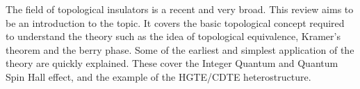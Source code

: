 The field of topological insulators is a recent and very broad. This review aims to be an introduction to the topic. It covers the basic topological concept required to understand the theory such as the idea of topological equivalence, Kramer's theorem and the berry phase. Some of the earliest and simplest application of the theory  are quickly explained. These cover the Integer Quantum and Quantum Spin Hall effect, and the example of the HGTE/CDTE heterostructure.